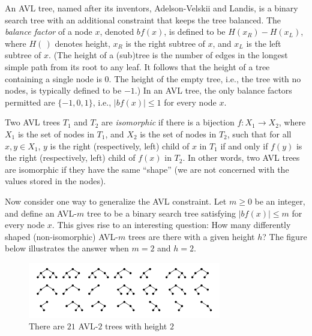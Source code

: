 

An AVL tree, named after its inventors, Adelson-Velskii and Landis, is a binary search tree
with an additional constraint that keeps the tree balanced. The \emph{balance factor} of
a node $x$, denoted $\mathit{bf}(x)$, is defined to be $H(x_R) - H(x_L)$, where $H(\,)$
denotes height, $x_R$ is the right subtree of $x$, and $x_L$ is the left subtree of $x$.
(The height of a (sub)tree is the number of edges in the longest simple path from its root
to any leaf. It follows that the height of a tree containing a single node is $0$.
The height of the empty tree, i.e., the tree with no nodes, is typically defined to be $-1$.)
In an AVL tree, the only balance factors permitted are $\{-1,0,1\}$, i.e., $|\mathit{bf}(x)| \leq 1$
for every node $x$.

Two AVL trees $T_1$ and $T_2$ are \emph{isomorphic} if there is a bijection
$f : X_1 \rightarrow X_2$, where $X_1$ is the set of nodes in $T_1$, and $X_2$ is the set
of nodes in $T_2$, such that for all $x,y \in X_1$, $y$ is the right (respectively, left) child
of $x$ in $T_1$ if and only if $f(y)$ is the right (respectively, left) child of $f(x)$ in $T_2$.
In other words, two AVL trees are isomorphic if they have the same ``shape''
(we are not concerned with the values stored in the nodes).

Now consider one way to generalize the AVL constraint. Let $m \geq 0$ be an integer, and
define an \mbox{AVL-$m$} tree to be a binary search tree satisfying $|\mathit{bf}(x)| \leq m$
for every node $x$. This gives rise to an interesting question: How many differently shaped
(non-isomorphic) \mbox{AVL-$m$} trees are there with a given height $h$? The figure below
illustrates the answer when $m=2$ and $h=2$.

\begin{figure}[!h]
\centering
\includegraphics[width=0.75\textwidth]{trees.png}
\caption{There are $21$ \mbox{AVL-$2$} trees with height $2$}
\end{figure}


